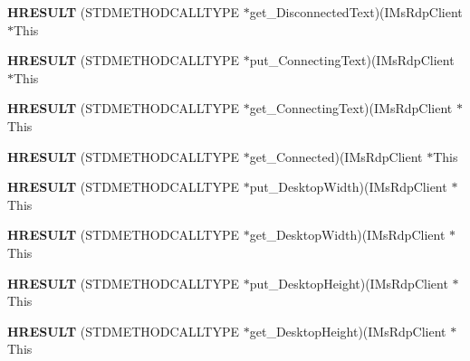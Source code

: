 \begin{DoxyCompactItemize}
\item 
\mbox{\label{struct_i_ms_rdp_client_vtbl_a725ae2cebc3f93d52582500f5d559152}} 
{\bfseries H\+R\+E\+S\+U\+LT} (S\+T\+D\+M\+E\+T\+H\+O\+D\+C\+A\+L\+L\+T\+Y\+PE $\ast$get\+\_\+\+Disconnected\+Text)(I\+Ms\+Rdp\+Client $\ast$This
\item 
\mbox{\label{struct_i_ms_rdp_client_vtbl_abe90bf84cda4e061773b0ec304aa4227}} 
{\bfseries H\+R\+E\+S\+U\+LT} (S\+T\+D\+M\+E\+T\+H\+O\+D\+C\+A\+L\+L\+T\+Y\+PE $\ast$put\+\_\+\+Connecting\+Text)(I\+Ms\+Rdp\+Client $\ast$This
\item 
\mbox{\label{struct_i_ms_rdp_client_vtbl_a82d0a50e46e69fd29eaa05f3b0989a78}} 
{\bfseries H\+R\+E\+S\+U\+LT} (S\+T\+D\+M\+E\+T\+H\+O\+D\+C\+A\+L\+L\+T\+Y\+PE $\ast$get\+\_\+\+Connecting\+Text)(I\+Ms\+Rdp\+Client $\ast$This
\item 
\mbox{\label{struct_i_ms_rdp_client_vtbl_aac740c95ed7c18e42988c994a33fb379}} 
{\bfseries H\+R\+E\+S\+U\+LT} (S\+T\+D\+M\+E\+T\+H\+O\+D\+C\+A\+L\+L\+T\+Y\+PE $\ast$get\+\_\+\+Connected)(I\+Ms\+Rdp\+Client $\ast$This
\item 
\mbox{\label{struct_i_ms_rdp_client_vtbl_a4e767924e69d2976bf5548ba3e70a108}} 
{\bfseries H\+R\+E\+S\+U\+LT} (S\+T\+D\+M\+E\+T\+H\+O\+D\+C\+A\+L\+L\+T\+Y\+PE $\ast$put\+\_\+\+Desktop\+Width)(I\+Ms\+Rdp\+Client $\ast$This
\item 
\mbox{\label{struct_i_ms_rdp_client_vtbl_ac6a0e753295ffe92beb0446af0c8658b}} 
{\bfseries H\+R\+E\+S\+U\+LT} (S\+T\+D\+M\+E\+T\+H\+O\+D\+C\+A\+L\+L\+T\+Y\+PE $\ast$get\+\_\+\+Desktop\+Width)(I\+Ms\+Rdp\+Client $\ast$This
\item 
\mbox{\label{struct_i_ms_rdp_client_vtbl_a03418cee9cf26afe4e84814992d28c99}} 
{\bfseries H\+R\+E\+S\+U\+LT} (S\+T\+D\+M\+E\+T\+H\+O\+D\+C\+A\+L\+L\+T\+Y\+PE $\ast$put\+\_\+\+Desktop\+Height)(I\+Ms\+Rdp\+Client $\ast$This
\item 
\mbox{\label{struct_i_ms_rdp_client_vtbl_ac0f820e846ab433ce159f5e2f9c2ea89}} 
{\bfseries H\+R\+E\+S\+U\+LT} (S\+T\+D\+M\+E\+T\+H\+O\+D\+C\+A\+L\+L\+T\+Y\+PE $\ast$get\+\_\+\+Desktop\+Height)(I\+Ms\+Rdp\+Client $\ast$This

\end{DoxyCompactItemize}
